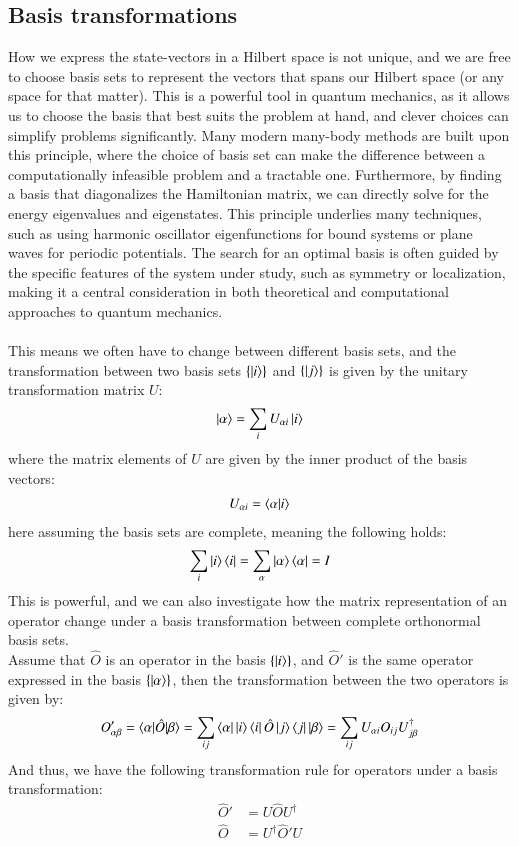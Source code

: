 \documentclass{subfiles}
\begin{document}
\subsection*{Basis transformations}
How we express the state-vectors in a Hilbert space is not unique, and we are free to choose basis sets to represent the vectors that spans our Hilbert space (or any space for that matter). This is a powerful tool in quantum mechanics, as it allows us to choose the basis that best suits the problem at hand, and clever choices can simplify problems significantly. Many modern many-body methods are built upon this principle, where the choice of basis set can make the difference between a computationally infeasible problem and a tractable one. Furthermore, by finding a basis that diagonalizes the Hamiltonian matrix, we can directly solve for the energy eigenvalues and eigenstates. This principle underlies many techniques, such as using harmonic oscillator eigenfunctions for bound systems or plane waves for periodic potentials. The search for an optimal basis is often guided by the specific features of the system under study, such as symmetry or localization, making it a central consideration in both theoretical and computational approaches to quantum mechanics. \\ \\ This means we often have to change between different basis sets, and the transformation between two basis sets $\{\ket{i}\}$ and $\{\ket{j}\}$ is given by the unitary transformation matrix $U$:
\begin{align*}
    \ket{\alpha} = \sum_i U_{\alpha i}\ket{i}
\end{align*}
where the matrix elements of $U$ are given by the inner product of the basis vectors:
\begin{align*}
    U_{\alpha i} = \braket{\alpha|i}
\end{align*}
here assuming the basis sets are complete, meaning the following holds:
\begin{align*}
    \sum_i \ket{i}\bra{i} = \sum_\alpha \ket{\alpha}\bra{\alpha} = I
\end{align*}
This is powerful, and we can also investigate how the matrix representation of an operator change under a basis transformation between complete orthonormal basis sets.\cite{szabo1996modern} \\
Assume that $\hat O$ is an operator in the basis $\{\ket{i}\}$, and $\hat O'$ is the same operator expressed in the basis $\{\ket{\alpha}\}$, then the transformation between the two operators is given by:
\begin{align*}
    O'_{\alpha\beta} = \braket{\alpha|\hat O|\beta} = \sum_{ij}\bra{\alpha}\ket{i}\bra{i}\hat O\ket{j}\bra{j}\ket{\beta} = \sum_{ij}U_{\alpha i}O_{ij}U^\dagger_{j\beta}
\end{align*}
And thus, we have the following transformation rule for operators under a basis transformation:
\begin{align*}
    \hat O' &= U\hat OU^\dagger \\
    \hat O &= U^\dagger\hat O'U
\end{align*}
\end{document}
